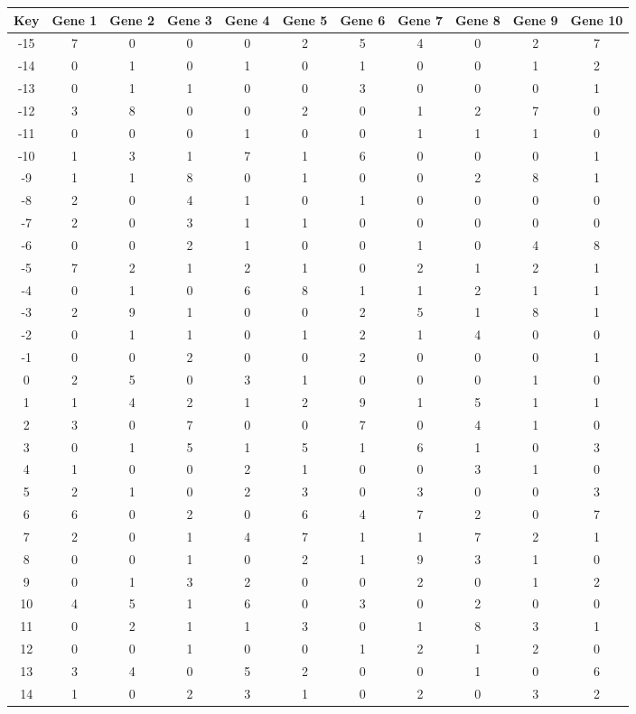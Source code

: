 \begin{tabular}{|c|c|c|c|c|c|c|c|c|c|c|}
\hline
Key & Gene 1 & Gene 2 & Gene 3 & Gene 4 & Gene 5 & Gene 6 & Gene 7 & Gene 8 & Gene 9 & Gene 10 \\
\hline
-15 & 7 & 0 & 0 & 0 & 2 & 5 & 4 & 0 & 2 & 7 \\
-14 & 0 & 1 & 0 & 1 & 0 & 1 & 0 & 0 & 1 & 2 \\
-13 & 0 & 1 & 1 & 0 & 0 & 3 & 0 & 0 & 0 & 1 \\
-12 & 3 & 8 & 0 & 0 & 2 & 0 & 1 & 2 & 7 & 0 \\
-11 & 0 & 0 & 0 & 1 & 0 & 0 & 1 & 1 & 1 & 0 \\
-10 & 1 & 3 & 1 & 7 & 1 & 6 & 0 & 0 & 0 & 1 \\
-9 & 1 & 1 & 8 & 0 & 1 & 0 & 0 & 2 & 8 & 1 \\
-8 & 2 & 0 & 4 & 1 & 0 & 1 & 0 & 0 & 0 & 0 \\
-7 & 2 & 0 & 3 & 1 & 1 & 0 & 0 & 0 & 0 & 0 \\
-6 & 0 & 0 & 2 & 1 & 0 & 0 & 1 & 0 & 4 & 8 \\
-5 & 7 & 2 & 1 & 2 & 1 & 0 & 2 & 1 & 2 & 1 \\
-4 & 0 & 1 & 0 & 6 & 8 & 1 & 1 & 2 & 1 & 1 \\
-3 & 2 & 9 & 1 & 0 & 0 & 2 & 5 & 1 & 8 & 1 \\
-2 & 0 & 1 & 1 & 0 & 1 & 2 & 1 & 4 & 0 & 0 \\
-1 & 0 & 0 & 2 & 0 & 0 & 2 & 0 & 0 & 0 & 1 \\
0 & 2 & 5 & 0 & 3 & 1 & 0 & 0 & 0 & 1 & 0 \\
1 & 1 & 4 & 2 & 1 & 2 & 9 & 1 & 5 & 1 & 1 \\
2 & 3 & 0 & 7 & 0 & 0 & 7 & 0 & 4 & 1 & 0 \\
3 & 0 & 1 & 5 & 1 & 5 & 1 & 6 & 1 & 0 & 3 \\
4 & 1 & 0 & 0 & 2 & 1 & 0 & 0 & 3 & 1 & 0 \\
5 & 2 & 1 & 0 & 2 & 3 & 0 & 3 & 0 & 0 & 3 \\
6 & 6 & 0 & 2 & 0 & 6 & 4 & 7 & 2 & 0 & 7 \\
7 & 2 & 0 & 1 & 4 & 7 & 1 & 1 & 7 & 2 & 1 \\
8 & 0 & 0 & 1 & 0 & 2 & 1 & 9 & 3 & 1 & 0 \\
9 & 0 & 1 & 3 & 2 & 0 & 0 & 2 & 0 & 1 & 2 \\
10 & 4 & 5 & 1 & 6 & 0 & 3 & 0 & 2 & 0 & 0 \\
11 & 0 & 2 & 1 & 1 & 3 & 0 & 1 & 8 & 3 & 1 \\
12 & 0 & 0 & 1 & 0 & 0 & 1 & 2 & 1 & 2 & 0 \\
13 & 3 & 4 & 0 & 5 & 2 & 0 & 0 & 1 & 0 & 6 \\
14 & 1 & 0 & 2 & 3 & 1 & 0 & 2 & 0 & 3 & 2 \\
\hline
\end{tabular}